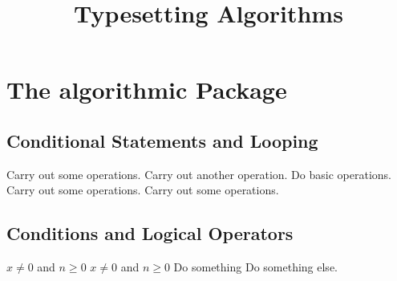 \documentclass{article}
\title{\Huge \textbf{Typesetting Algorithms}}
\date{}
\begin{document}
	\maketitle
	
	\section{The algorithmic Package}
	\subsection{Conditional Statements and Looping}
	
	\begin{algorithmic}[1]
			\STATE Carry out some operations.
			\STATE Carry out another operation.
		\ELSE
			\STATE Do basic operations.
		\ENDIF
			\STATE Carry out some operations.
		\ENDFOR
			\STATE Carry out some operations.
		\ENDWHILE
	\end{algorithmic}
	
	\bigskip
	\subsection{Conditions and Logical Operators}
	
	\begin{algorithmic}[1]
		\REQUIRE $x \neq 0$ and $n \geq 0$
		\ENSURE $x \neq 0$ and $n \geq 0$
			\STATE Do something 
			\STATE Do something else.
			\RETURN \TRUE
		\ENDIF
	\end{algorithmic}
	
	\pagebreak
\end{document}
